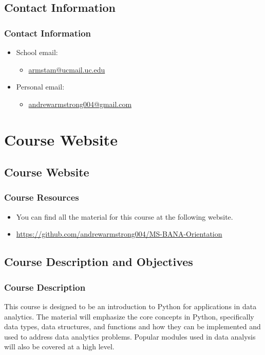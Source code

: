 \documentclass[mini frame in current subsection]{beamer}
\begin{document}
	\subsection{Contact Information}
		\begin{frame}
			\frametitle{Contact Information}
				\begin{itemize}
					\vfill\item  School email:  
						\begin{itemize}
							\item  \href{mailto:armstam@ucmail.uc.edu}{armstam@ucmail.uc.edu}
						\end{itemize}
					\vfill\item  Personal email:  
						\begin{itemize}
							\item  \href{mailto:andrewarmstrong004@gmail.com}{andrewarmstrong004@gmail.com}
						\end{itemize}
				\end{itemize}\vspace{2.5em}
		\end{frame}
		
\section{Course Website}
	\subsection{Course Website}
	
		\begin{frame}
			\frametitle{Course Resources}
			\begin{itemize}
				\vfill\item  You can find all the material for this course at the following website.
				\vfill\item  \url{https://github.com/andrewarmstrong004/MS-BANA-Orientation}
			\end{itemize}
		\end{frame}
		
	
	\subsection{Course Description and Objectives}
		\begin{frame}
			\frametitle{Course Description}
			
				This course is designed to be an introduction to Python for applications in data analytics.  The material will emphasize the core concepts in Python, specifically data types, data structures, and functions and how they can be implemented and used to address data analytics problems.  Popular modules used in data analysis will also be covered at a high level.
				
		\end{frame}
		
\end{document}

